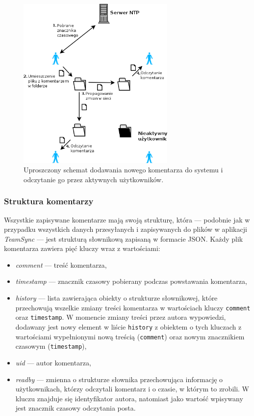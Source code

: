 \documentclass[polish,a4paper,twoside]{ppfcmthesis}
\begin{document}
\begin{figure}[t]
  \vspace{5pt}
  \begin{center}
    \includegraphics[width=220pt]{figures/writecomment.png}
  \end{center}
  \caption{Uproszczony schemat dodawania nowego komentarza do systemu i odczytanie go przez aktywnych użytkowników.}
  \label{rys:writecomment}
\end{figure}

\subsubsection*{Struktura komentarzy}

Wszystkie zapisywane komentarze mają swoją strukturę, która --- podobnie jak w przypadku wszystkich danych przesyłanych i zapisywanych do plików w aplikacji \emph{TeamSync} --- jest strukturą słownikową zapisaną w formacie JSON. Każdy plik komentarza zawiera pięć kluczy wraz z wartościami:

\begin{itemize}[noitemsep]
 \item \emph{comment} --- treść komentarza,
 
 \item \emph{timestamp} --- znacznik czasowy pobierany podczas powstawania komentarza,
 
 \item \emph{history} --- lista zawierająca obiekty o strukturze słownikowej, które przechowują wszelkie zmiany treści komentarza w wartościach kluczy \texttt{comment} oraz \texttt{timestamp}. W momencie zmiany treści przez autora wypowiedzi, dodawany jest nowy element w liście \texttt{history} z obiektem o tych kluczach z wartościami wypełnionymi nową treścią (\texttt{comment}) oraz nowym znacznikiem czasowym (\texttt{timestamp}),
 
 \item \emph{uid} --- autor komentarza,
 
 \item \emph{readby} --- zmienna o strukturze słownika przechowująca informację o użytkownikach, którzy odczytali komentarz i o czasie, w którym to zrobili. W kluczu znajduje się identyfikator autora, natomiast jako wartość wpisywany jest znacznik czasowy odczytania posta.
\end{itemize}
\end{document}
